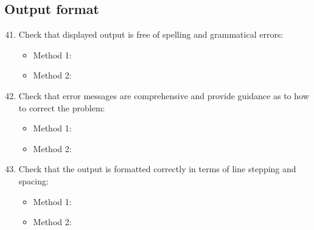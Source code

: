 \subsection{Output format}
\begin{enumerate}
	\setcounter{enumi}{40}
	\item Check that displayed output is free of spelling and grammatical errors:
	\begin{itemize}
		\item Method 1: \cmark
		\item Method 2:
	\end{itemize}
	\item Check that error messages are comprehensive and provide guidance as to how to correct the problem:
	\begin{itemize}
		\item Method 1: \cmark
		\item Method 2:
	\end{itemize}
	\item Check that the output is formatted correctly in terms of line stepping and spacing:
	\begin{itemize}
		\item Method 1: \cmark
		\item Method 2: 
	\end{itemize}
\end{enumerate}